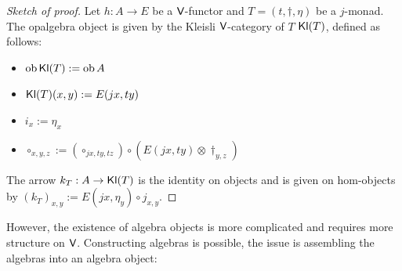 \documentclass[10pt,a4paper]{article}
\newcommand{\cat}[1]{\textcat{#1}}
\newcommand{\textcat}[1]{{\normalfont\textsf{#1}}}
\DeclareMathOperator{\ob}{ob}
\theoremstyle{plain}
\theoremstyle{definition}
\theoremstyle{remark}
\begin{document}
\begin{proof}[Sketch of proof]
    Let $h : A \to E$ be a $\cat V$-functor and $T = (t, \dag, \eta)$ be a $j$-monad. The opalgebra object is given by the Kleisli $\cat V$-category of $T$ $\cat{Kl}(T)$, defined as follows:
    \begin{itemize}
        \item $\ob\cat{Kl}(T) := \ob A$
        \item $\cat{Kl}(T)(x, y) := E(jx, ty)$
        \item $i_x := \eta_x$
        \item $\circ_{x, y, z} := (\circ_{jx, ty, tz}) \circ (E(jx, ty)\otimes\dag_{y, z})$
    \end{itemize}
    The arrow $k_T : A \to \cat{Kl}(T)$ is the identity on objects and is given on hom-objects by $(k_T)_{x, y} := E(jx, \eta_y)\circ j_{x, y}$.
\end{proof}

However, the existence of algebra objects is more complicated and requires more structure on $\cat V$. Constructing algebras is possible, the issue is assembling the algebras into an algebra object:
\end{document}
